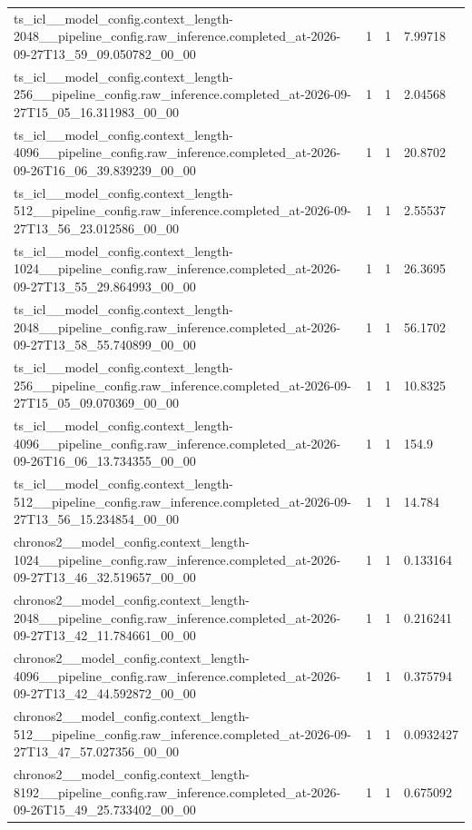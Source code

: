 \begin{tabular}{llll}
ts\_icl\_\_model\_config.context\_length-2048\_\_pipeline\_config.raw\_inference.completed\_at-2026-09-27T13\_59\_09.050782\_00\_00 & 1 & 1 & 7.99718 \\
ts\_icl\_\_model\_config.context\_length-256\_\_pipeline\_config.raw\_inference.completed\_at-2026-09-27T15\_05\_16.311983\_00\_00 & 1 & 1 & 2.04568 \\
ts\_icl\_\_model\_config.context\_length-4096\_\_pipeline\_config.raw\_inference.completed\_at-2026-09-26T16\_06\_39.839239\_00\_00 & 1 & 1 & 20.8702 \\
ts\_icl\_\_model\_config.context\_length-512\_\_pipeline\_config.raw\_inference.completed\_at-2026-09-27T13\_56\_23.012586\_00\_00 & 1 & 1 & 2.55537 \\
ts\_icl\_\_model\_config.context\_length-1024\_\_pipeline\_config.raw\_inference.completed\_at-2026-09-27T13\_55\_29.864993\_00\_00 & 1 & 1 & 26.3695 \\
ts\_icl\_\_model\_config.context\_length-2048\_\_pipeline\_config.raw\_inference.completed\_at-2026-09-27T13\_58\_55.740899\_00\_00 & 1 & 1 & 56.1702 \\
ts\_icl\_\_model\_config.context\_length-256\_\_pipeline\_config.raw\_inference.completed\_at-2026-09-27T15\_05\_09.070369\_00\_00 & 1 & 1 & 10.8325 \\
ts\_icl\_\_model\_config.context\_length-4096\_\_pipeline\_config.raw\_inference.completed\_at-2026-09-26T16\_06\_13.734355\_00\_00 & 1 & 1 & 154.9 \\
ts\_icl\_\_model\_config.context\_length-512\_\_pipeline\_config.raw\_inference.completed\_at-2026-09-27T13\_56\_15.234854\_00\_00 & 1 & 1 & 14.784 \\
chronos2\_\_model\_config.context\_length-1024\_\_pipeline\_config.raw\_inference.completed\_at-2026-09-27T13\_46\_32.519657\_00\_00 & 1 & 1 & 0.133164 \\
chronos2\_\_model\_config.context\_length-2048\_\_pipeline\_config.raw\_inference.completed\_at-2026-09-27T13\_42\_11.784661\_00\_00 & 1 & 1 & 0.216241 \\
chronos2\_\_model\_config.context\_length-4096\_\_pipeline\_config.raw\_inference.completed\_at-2026-09-27T13\_42\_44.592872\_00\_00 & 1 & 1 & 0.375794 \\
chronos2\_\_model\_config.context\_length-512\_\_pipeline\_config.raw\_inference.completed\_at-2026-09-27T13\_47\_57.027356\_00\_00 & 1 & 1 & 0.0932427 \\
chronos2\_\_model\_config.context\_length-8192\_\_pipeline\_config.raw\_inference.completed\_at-2026-09-26T15\_49\_25.733402\_00\_00 & 1 & 1 & 0.675092 \\

\end{tabular}

